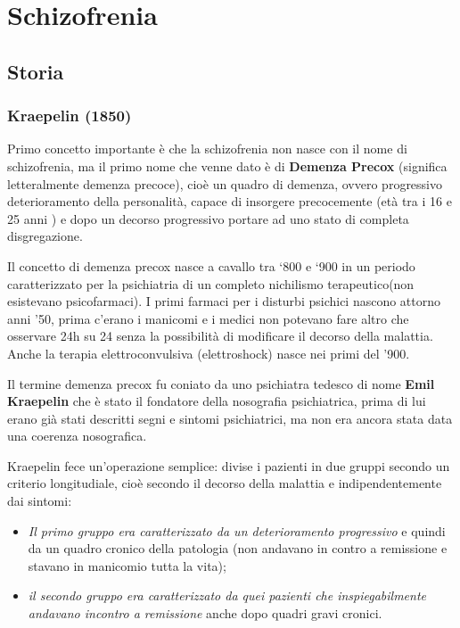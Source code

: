 \section{Schizofrenia}

\subsection{Storia}

\subsubsection{Kraepelin (1850)}

Primo concetto importante è che la schizofrenia non nasce con il nome di
schizofrenia, ma il primo nome che venne dato è di \textbf{Demenza
Precox} (significa letteralmente demenza precoce), cioè un quadro di
demenza, ovvero progressivo deterioramento della personalità, capace di
insorgere precocemente (età tra i 16 e 25 anni ) e dopo un decorso
progressivo portare ad uno stato di completa disgregazione.

Il concetto di demenza precox nasce a cavallo tra `800 e `900 in un
periodo caratterizzato per la psichiatria di un completo nichilismo
terapeutico(non esistevano psicofarmaci). I primi farmaci per i disturbi
psichici nascono attorno anni '50, prima c'erano i manicomi e i medici
non potevano fare altro che osservare 24h su 24 senza la possibilità di
modificare il decorso della malattia. Anche la terapia elettroconvulsiva
(elettroshock) nasce nei primi del '900.

Il termine demenza precox fu coniato da uno psichiatra tedesco di nome
\textbf{Emil Kraepelin} che è stato il fondatore della nosografia
psichiatrica, prima di lui erano già stati descritti segni e sintomi
psichiatrici, ma non era ancora stata data una coerenza nosografica.

Kraepelin fece un'operazione semplice: divise i pazienti in due gruppi
secondo un criterio longitudiale, cioè secondo il decorso della malattia
e indipendentemente dai sintomi:

\begin{itemize}
\item
  \emph{Il primo gruppo era caratterizzato da un deterioramento
  progressivo} e quindi da un quadro cronico della patologia (non
  andavano in contro a remissione e stavano in manicomio tutta la vita);
\item
  \emph{il secondo gruppo era caratterizzato da quei pazienti che
  inspiegabilmente andavano incontro a remissione} anche dopo quadri
  gravi cronici.
\end{itemize}

